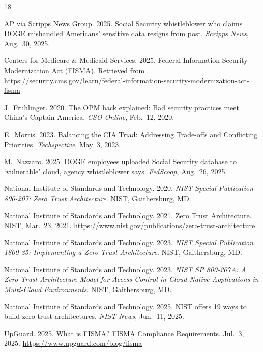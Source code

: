 \documentclass[sigconf,nonacm]{acmart}
\begin{document}
\sloppy

\begin{thebibliography}{18}

AP via Scripps News Group. 2025. Social Security whistleblower who claims DOGE
mishandled Americans' sensitive data resigns from post. \textit{Scripps News}, Aug.~30,
2025.

Centers for Medicare \& Medicaid Services. 2025. Federal Information Security
Modernization Act (FISMA). Retrieved from
\url{https://security.cms.gov/learn/federal-information-security-modernization-act-fisma}

J.~Fruhlinger. 2020. The OPM hack explained: Bad security practices meet China's
Captain America. \textit{CSO Online}, Feb.~12, 2020.

E.~Morris. 2023. Balancing the CIA Triad: Addressing Trade-offs and Conflicting
Priorities. \textit{Techspective}, May~3, 2023.

M.~Nazzaro. 2025. DOGE employees uploaded Social Security database to `vulnerable'
cloud, agency whistleblower says. \textit{FedScoop}, Aug.~26, 2025.

National Institute of Standards and Technology. 2020. \textit{NIST Special Publication
800-207: Zero Trust Architecture}. NIST, Gaithersburg, MD.

National Institute of Standards and Technology. 2021. Zero Trust Architecture. NIST,
Mar.~23, 2021. \url{https://www.nist.gov/publications/zero-trust-architecture}

National Institute of Standards and Technology. 2023. \textit{NIST Special Publication
1800-35: Implementing a Zero Trust Architecture}. NIST, Gaithersburg, MD.

National Institute of Standards and Technology. 2023. \textit{NIST SP 800-207A: A Zero
Trust Architecture Model for Access Control in Cloud-Native Applications in Multi-Cloud
Environments}. NIST, Gaithersburg, MD.

National Institute of Standards and Technology. 2025. NIST offers 19 ways to build zero
trust architectures. \textit{NIST News}, Jun.~11, 2025.

UpGuard. 2025. What is FISMA? FISMA Compliance Requirements. Jul.~3, 2025.
\url{https://www.upguard.com/blog/fisma}

\end{thebibliography}
\end{document}
